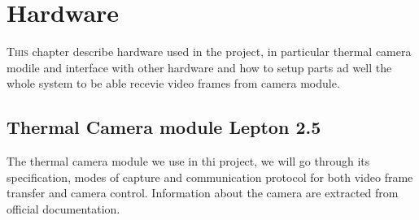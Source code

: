 \chapter{Hardware}
\lettrine[lines=3]{T}{his} chapter describe hardware used in the project, in particular thermal camera modile
and interface with other hardware and how to setup parts ad well the whole system
to be able recevie video frames from camera module.

\section{Thermal Camera module Lepton 2.5}

The thermal camera module we use in thi project, we will go through its specification, modes of capture and communication protocol for both video frame transfer and camera control.
Information about the camera are extracted from official documentation.


